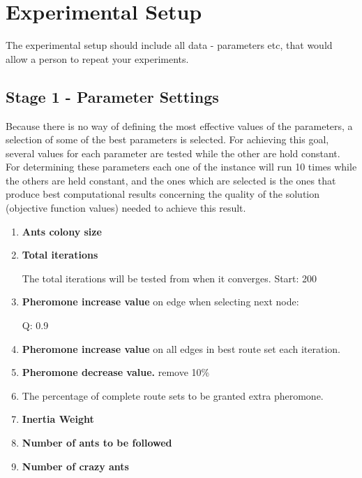 \section{Experimental Setup}

The experimental setup should include all data - parameters etc, that would allow a person to repeat your experiments. 
 
\subsection{Stage 1 - Parameter Settings}
\label{subsec:parameterSettings_setup}

Because there is no way of defining the most effective values of the parameters, a selection of some of the best parameters is selected. For achieving this goal, several values for each parameter are tested while the other are hold constant. For determining these parameters each one of the instance will run 10 times while the others are held constant, and the ones which are selected is the ones that produce best computational results concerning the quality of the solution (objective function values) needed to achieve this result. 

\begin{enumerate}
\item \textbf{Ants colony size}
\item \textbf{Total iterations}

The total iterations will be tested from when it converges. Start: 200

\item \textbf{Pheromone increase value} on edge when selecting next node:



Q: 0.9
\newline


\item \textbf{Pheromone increase value} on all edges in best route set each iteration.
\item \textbf{Pheromone decrease value.} remove 10\%
\item The percentage of complete route sets to be granted extra pheromone.
\item \textbf{Inertia Weight}
\item \textbf{Number of ants to be followed}
\item \textbf{Number of crazy ants}


\end{enumerate}

